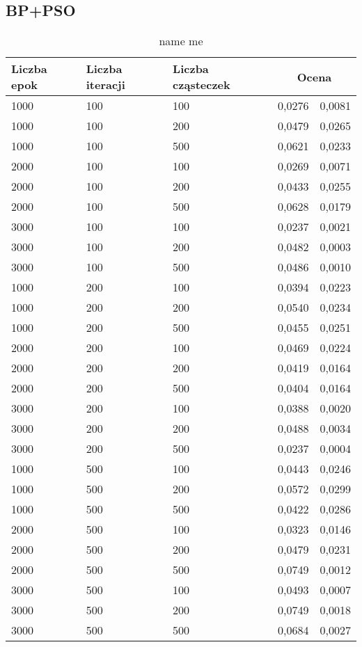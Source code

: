 \documentclass[11pt,a4paper,oneside]{report}
\begin{document}
\subsection{BP+PSO}
\begin{center}
	\begin{longtable}{|l|l|l|r@{$\pm$}r|}
		\caption{name me}\\
		\hline
		Liczba epok & Liczba iteracji & Liczba cząsteczek & \multicolumn{2}{|c|}{Ocena}\\ \hline \hline\endhead
		1000 & 100 & 100 & 0,0276 & 0,0081\\ \hline
		1000 & 100 & 200 & 0,0479 & 0,0265\\ \hline
		1000 & 100 & 500 & 0,0621 & 0,0233\\ \hline
		2000 & 100 & 100 & 0,0269 & 0,0071\\ \hline
		2000 & 100 & 200 & 0,0433 & 0,0255\\ \hline
		2000 & 100 & 500 & 0,0628 & 0,0179\\ \hline
		3000 & 100 & 100 & 0,0237 & 0,0021\\ \hline
		3000 & 100 & 200 & 0,0482 & 0,0003\\ \hline
		3000 & 100 & 500 & 0,0486 & 0,0010\\ \hline
		1000 & 200 & 100 & 0,0394 & 0,0223\\ \hline
		1000 & 200 & 200 & 0,0540 & 0,0234\\ \hline
		1000 & 200 & 500 & 0,0455 & 0,0251\\ \hline
		2000 & 200 & 100 & 0,0469 & 0,0224\\ \hline
		2000 & 200 & 200 & 0,0419 & 0,0164\\ \hline
		2000 & 200 & 500 & 0,0404 & 0,0164\\ \hline
		3000 & 200 & 100 & 0,0388 & 0,0020\\ \hline
		3000 & 200 & 200 & 0,0488 & 0,0034\\ \hline
		3000 & 200 & 500 & 0,0237 & 0,0004\\ \hline
		1000 & 500 & 100 & 0,0443 & 0,0246\\ \hline
		1000 & 500 & 200 & 0,0572 & 0,0299\\ \hline
		1000 & 500 & 500 & 0,0422 & 0,0286\\ \hline
		2000 & 500 & 100 & 0,0323 & 0,0146\\ \hline
		2000 & 500 & 200 & 0,0479 & 0,0231\\ \hline
		2000 & 500 & 500 & 0,0749 & 0,0012\\ \hline
		3000 & 500 & 100 & 0,0493 & 0,0007\\ \hline
		3000 & 500 & 200 & 0,0749 & 0,0018\\ \hline
		3000 & 500 & 500 & 0,0684 & 0,0027\\ \hline
	\end{longtable}
\end{center}
\end{document}
